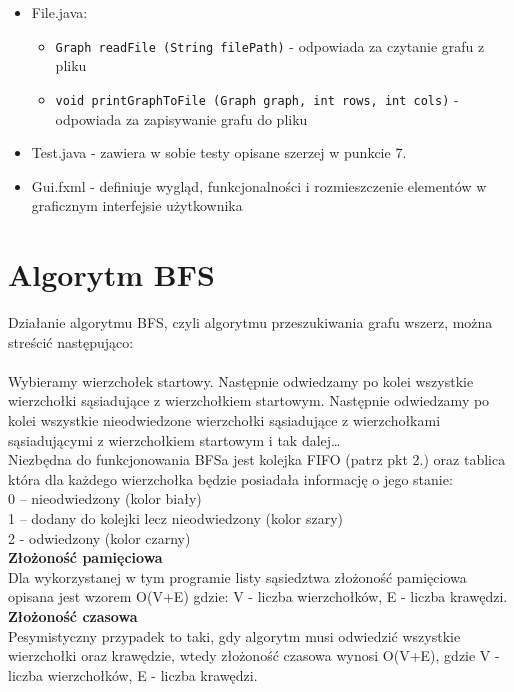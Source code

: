 \documentclass{article}
\begin{document}
\begin{itemize}
\item File.java:
    \begin{itemize}
    \item \texttt{\footnotesize Graph readFile (String filePath)} - odpowiada za czytanie grafu z pliku
    \item \texttt{\footnotesize void printGraphToFile (Graph graph, int rows, int cols)} - odpowiada za zapisywanie grafu do pliku
    \end{itemize}

\item Test.java - zawiera w sobie testy opisane szerzej w punkcie 7.
   
    
    
    
\item Gui.fxml - definiuje wygląd, funkcjonalności i rozmieszczenie elementów w graficznym interfejsie użytkownika
    
\end{itemize}


\section{Algorytm BFS}
Działanie algorytmu BFS, czyli algorytmu przeszukiwania grafu wszerz, można streścić następująco: \\ \\
Wybieramy wierzchołek startowy. Następnie odwiedzamy po kolei wszystkie wierzchołki sąsiadujące z wierzchołkiem startowym. Następnie odwiedzamy po kolei wszystkie nieodwiedzone wierzchołki sąsiadujące z wierzchołkami sąsiadującymi z wierzchołkiem startowym i tak dalej…\\
Niezbędna do funkcjonowania BFSa jest kolejka FIFO (patrz pkt 2.) oraz tablica która dla każdego wierzchołka będzie posiadała informację o jego stanie: \\

0  – nieodwiedzony (kolor biały) \\
1 – dodany do kolejki lecz nieodwiedzony (kolor szary) \\
2  - odwiedzony (kolor czarny) \\

\textbf{Złożoność pamięciowa}
 \\Dla wykorzystanej w tym programie listy sąsiedztwa złożoność pamięciowa opisana jest wzorem O(V+E) gdzie: V - liczba wierzchołków, E - liczba krawędzi.\\

\textbf{Złożoność czasowa}
\\Pesymistyczny przypadek to taki, gdy algorytm musi odwiedzić wszystkie wierzchołki oraz krawędzie, wtedy złożoność czasowa wynosi O(V+E), gdzie V - liczba wierzchołków, E - liczba krawędzi.
\end{document}
